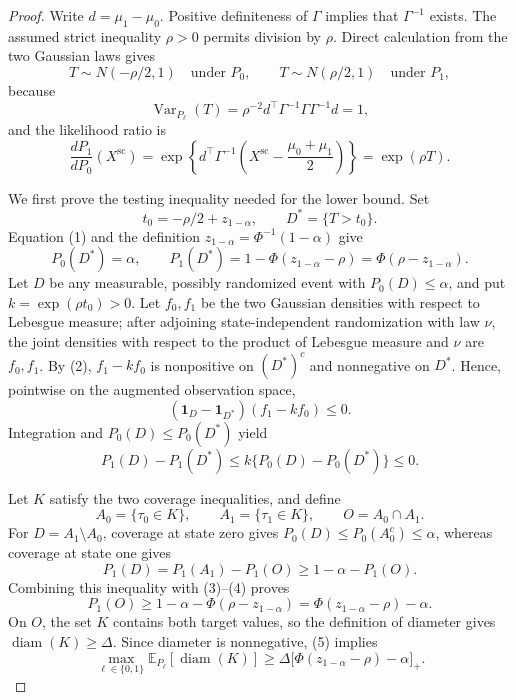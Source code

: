 \documentclass{article}
\begin{document}
\begin{proof}
Write \(d=\mu_1-\mu_0\). Positive definiteness of \(\Gamma\) implies that \(\Gamma^{-1}\) exists. The assumed strict inequality \(\rho>0\) permits division by \(\rho\). Direct calculation from the two Gaussian laws gives
\[
 T\sim N(-\rho/2,1)\quad\text{under }P_0,
 \qquad
 T\sim N(\rho/2,1)\quad\text{under }P_1,
 \tag{1}
\]
because
\[
 \operatorname{Var}_{P_\ell}(T)
 =\rho^{-2}d^{\top}\Gamma^{-1}\Gamma\Gamma^{-1}d=1,
\]
and the likelihood ratio is
\[
 \frac{dP_1}{dP_0}(X^{\mathrm{sc}})
 =\exp\!\left\{d^{\top}\Gamma^{-1}
 \left(X^{\mathrm{sc}}-\frac{\mu_0+\mu_1}{2}\right)\right\}
 =\exp(\rho T).
 \tag{2}
\]

We first prove the testing inequality needed for the lower bound. Set
\[
 t_0=-\rho/2+z_{1-\alpha},
 \qquad
 D^*=\{T>t_0\}.
\]
Equation (1) and the definition \(z_{1-\alpha}=\Phi^{-1}(1-\alpha)\) give
\[
 P_0(D^*)=\alpha,
 \qquad
 P_1(D^*)=1-\Phi(z_{1-\alpha}-\rho)
 =\Phi(\rho-z_{1-\alpha}).
 \tag{3}
\]
Let \(D\) be any measurable, possibly randomized event with \(P_0(D)\leq\alpha\), and put \(k=\exp(\rho t_0)>0\). Let \(f_0,f_1\) be the two Gaussian densities with respect to Lebesgue measure; after adjoining state-independent randomization with law \(\nu\), the joint densities with respect to the product of Lebesgue measure and \(\nu\) are \(f_0,f_1\). By (2), \(f_1-kf_0\) is nonpositive on \((D^*)^c\) and nonnegative on \(D^*\). Hence, pointwise on the augmented observation space,
\[
 (\mathbf 1_D-\mathbf 1_{D^*})(f_1-kf_0)\leq0.
\]
Integration and \(P_0(D)\leq P_0(D^*)\) yield
\[
 P_1(D)-P_1(D^*)
 \leq k\{P_0(D)-P_0(D^*)\}\leq0.
 \tag{4}
\]

Let \(K\) satisfy the two coverage inequalities, and define
\[
 A_0=\{\tau_0\in K\},
 \qquad
 A_1=\{\tau_1\in K\},
 \qquad
 O=A_0\cap A_1.
\]
For \(D=A_1\setminus A_0\), coverage at state zero gives \(P_0(D)\leq P_0(A_0^c)\leq\alpha\), whereas coverage at state one gives
\[
 P_1(D)=P_1(A_1)-P_1(O)\geq1-\alpha-P_1(O).
\]
Combining this inequality with (3)--(4) proves
\[
 P_1(O)
 \geq1-\alpha-\Phi(\rho-z_{1-\alpha})
 =\Phi(z_{1-\alpha}-\rho)-\alpha.
 \tag{5}
\]
On \(O\), the set \(K\) contains both target values, so the definition of diameter gives \(\operatorname{diam}(K)\geq\Delta\). Since diameter is nonnegative, (5) implies
\[
 \max_{\ell\in\{0,1\}}
 \mathbb E_{P_\ell}[\operatorname{diam}(K)]
 \geq
 \Delta\bigl[\Phi(z_{1-\alpha}-\rho)-\alpha\bigr]_+.
 \tag{6}
\]


\end{proof}
\end{document}
